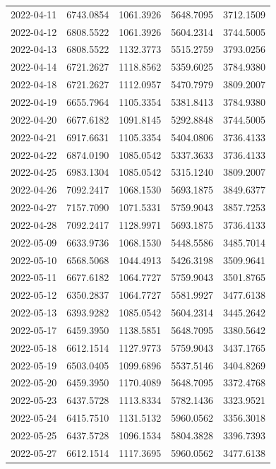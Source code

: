 \begin{footnotesize}
\begin{longtable}{lllll}
2022-04-11 & 6743.0854 & 1061.3926 & 5648.7095 & 3712.1509 \\
2022-04-12 & 6808.5522 & 1061.3926 & 5604.2314 & 3744.5005 \\
2022-04-13 & 6808.5522 & 1132.3773 & 5515.2759 & 3793.0256 \\
2022-04-14 & 6721.2627 & 1118.8562 & 5359.6025 & 3784.9380 \\
2022-04-18 & 6721.2627 & 1112.0957 & 5470.7979 & 3809.2007 \\
2022-04-19 & 6655.7964 & 1105.3354 & 5381.8413 & 3784.9380 \\
2022-04-20 & 6677.6182 & 1091.8145 & 5292.8848 & 3744.5005 \\
2022-04-21 & 6917.6631 & 1105.3354 & 5404.0806 & 3736.4133 \\
2022-04-22 & 6874.0190 & 1085.0542 & 5337.3633 & 3736.4133 \\
2022-04-25 & 6983.1304 & 1085.0542 & 5315.1240 & 3809.2007 \\
2022-04-26 & 7092.2417 & 1068.1530 & 5693.1875 & 3849.6377 \\
2022-04-27 & 7157.7090 & 1071.5331 & 5759.9043 & 3857.7253 \\
2022-04-28 & 7092.2417 & 1128.9971 & 5693.1875 & 3736.4133 \\
2022-05-09 & 6633.9736 & 1068.1530 & 5448.5586 & 3485.7014 \\
2022-05-10 & 6568.5068 & 1044.4913 & 5426.3198 & 3509.9641 \\
2022-05-11 & 6677.6182 & 1064.7727 & 5759.9043 & 3501.8765 \\
2022-05-12 & 6350.2837 & 1064.7727 & 5581.9927 & 3477.6138 \\
2022-05-13 & 6393.9282 & 1085.0542 & 5604.2314 & 3445.2642 \\
2022-05-17 & 6459.3950 & 1138.5851 & 5648.7095 & 3380.5642 \\
2022-05-18 & 6612.1514 & 1127.9773 & 5759.9043 & 3437.1765 \\
2022-05-19 & 6503.0405 & 1099.6896 & 5537.5146 & 3404.8269 \\
2022-05-20 & 6459.3950 & 1170.4089 & 5648.7095 & 3372.4768 \\
2022-05-23 & 6437.5728 & 1113.8334 & 5782.1436 & 3323.9521 \\
2022-05-24 & 6415.7510 & 1131.5132 & 5960.0562 & 3356.3018 \\
2022-05-25 & 6437.5728 & 1096.1534 & 5804.3828 & 3396.7393 \\
2022-05-27 & 6612.1514 & 1117.3695 & 5960.0562 & 3477.6138 \\

\end{longtable}
\end{footnotesize}
